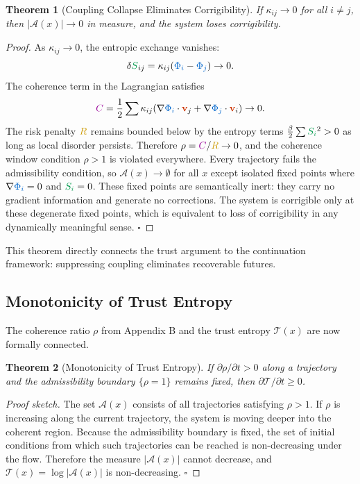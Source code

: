 \documentclass[11pt,a4paper]{article}
\newcommand{\scalar}[1]{\textcolor{scalarcolor}{\ensuremath{#1}}}
\newcommand{\vect}[1]{\textcolor{vectorcolor}{\ensuremath{\mathbf{#1}}}}
\newcommand{\entropy}[1]{\textcolor{entropycolor}{\ensuremath{#1}}}
\newcommand{\coherence}[1]{\textcolor{coherencecolor}{\ensuremath{#1}}}
\newcommand{\risk}[1]{\textcolor{riskcolor}{\ensuremath{#1}}}
\theoremstyle{definition}
\theoremstyle{plain}
\newtheorem{theorem}{Theorem}
\begin{document}
\begin{mdframed}[style=appendixbox]
\begin{theorem}[Coupling Collapse Eliminates Corrigibility]
If $\kappa_{ij} \to 0$ for all $i \neq j$, then $|\mathcal{A}(x)| \to 0$ in measure, and the system loses corrigibility.
\end{theorem}

\begin{proof}
As $\kappa_{ij} \to 0$, the entropic exchange vanishes:
\[
\delta\entropy{S}_{ij} = \kappa_{ij}(\scalar{\Phi_i} - \scalar{\Phi_j}) \to 0.
\]
The coherence term in the Lagrangian satisfies
\[
\coherence{C} = \frac{1}{2}\sum \kappa_{ij}(\nabla\scalar{\Phi_i}\cdot\vect{v}_j + \nabla\scalar{\Phi_j}\cdot\vect{v}_i) \to 0.
\]
The risk penalty $\risk{R}$ remains bounded below by the entropy terms $\frac{\beta}{2}\sum\entropy{S_i}^2 > 0$ as long as local disorder persists. Therefore $\rho = \coherence{C}/\risk{R} \to 0$, and the coherence window condition $\rho > 1$ is violated everywhere. Every trajectory fails the admissibility condition, so $\mathcal{A}(x) \to \emptyset$ for all $x$ except isolated fixed points where $\nabla\scalar{\Phi_i} = 0$ and $\entropy{S_i} = 0$. These fixed points are semantically inert: they carry no gradient information and generate no corrections. The system is corrigible only at these degenerate fixed points, which is equivalent to loss of corrigibility in any dynamically meaningful sense. $\square$
\end{proof}

This theorem directly connects the trust argument to the continuation framework: suppressing coupling eliminates recoverable futures.

\subsection{Monotonicity of Trust Entropy}

The coherence ratio $\rho$ from Appendix B and the trust entropy $\mathcal{T}(x)$ are now formally connected.

\begin{theorem}[Monotonicity of Trust Entropy]
If $\partial\rho/\partial t > 0$ along a trajectory and the admissibility boundary $\{\rho = 1\}$ remains fixed, then $\partial\mathcal{T}/\partial t \geq 0$.
\end{theorem}

\begin{proof}[Proof sketch]
The set $\mathcal{A}(x)$ consists of all trajectories satisfying $\rho > 1$. If $\rho$ is increasing along the current trajectory, the system is moving deeper into the coherent region. Because the admissibility boundary is fixed, the set of initial conditions from which such trajectories can be reached is non-decreasing under the flow. Therefore the measure $|\mathcal{A}(x)|$ cannot decrease, and $\mathcal{T}(x) = \log|\mathcal{A}(x)|$ is non-decreasing. $\square$
\end{proof}


\end{mdframed}
\end{document}
